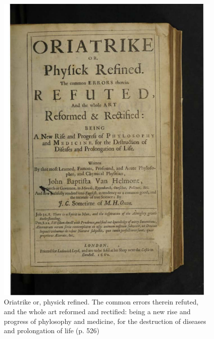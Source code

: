 \documentclass[
]{book}
\begin{document}
\hfill\break

\begin{figure}

{\centering \includegraphics[width=0.8\linewidth]{images11/oriatrike} 

}

\caption{Oriatrike or, physick refined. The common errors therein refuted, and the whole art reformed and rectified: being a new rise and progress of phylosophy and medicine, for the destruction of diseases and prolongation of life (p. 526)}\label{fig:fig67}
\end{figure}

\hfill\break
\end{document}
